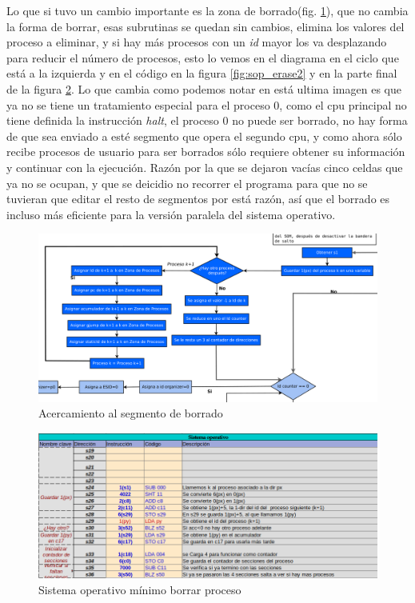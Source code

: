 \documentclass[letterpaper,12pt,oneside]{book}
\begin{document}
			Lo que si tuvo un cambio importante es la zona de borrado(fig. \ref{fig:diag_somp_erase}), que no cambia la forma de borrar, esas subrutinas se quedan
			sin cambios, elimina los valores del proceso a eliminar, y si hay más procesos con un \textit{id} mayor los va desplazando para reducir el número
			de procesos, esto lo vemos en el diagrama en el ciclo que está a la izquierda y en el código en la figura \ref{fig:sop_erase2} y en la parte
			final de la figura \ref{fig:sop_erase1}. Lo que cambia como podemos notar en está ultima imagen es que ya no se tiene un tratamiento especial
			para el proceso 0, como el cpu principal no tiene definida la instrucción \textit{halt}, el proceso 0 no puede ser borrado, no hay forma
			de que sea enviado a esté segmento que opera el segundo cpu, y como ahora sólo recibe procesos de usuario para ser borrados sólo requiere obtener
			su información y continuar con la ejecución. Razón por la que se dejaron vacías cinco celdas que ya no se ocupan, y que se deicidio no recorrer el programa
			para que no se tuvieran que editar el resto de segmentos por está razón, así que el borrado es incluso más eficiente para
			la versión paralela del sistema operativo.
			


			
			\begin{figure}[h]		
				\centering
				\includegraphics[scale=0.32]{media/Paralela/diag_somp_erase.png}
				\caption{Acercamiento al segmento de borrado}
				\label{fig:diag_somp_erase}
			\end{figure}	
			
			
			\begin{figure}[h]		
				\centering
				\includegraphics[scale=0.53]{media/Paralela/sop_erase1.png}
				\caption{Sistema operativo mínimo borrar proceso}
				\label{fig:sop_erase1}
			\end{figure}
			
\end{document}
